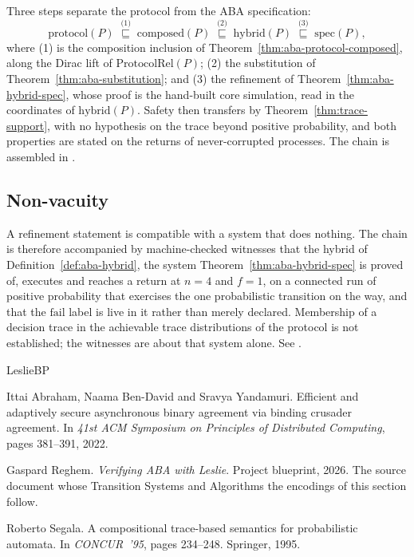 Three steps separate the protocol from the ABA specification:
\[
  \mathrm{protocol}(P)
  \;\overset{\text{(1)}}{\sqsubseteq}\; \mathrm{composed}(P)
  \;\overset{\text{(2)}}{\sqsubseteq}\; \mathrm{hybrid}(P)
  \;\overset{\text{(3)}}{\sqsubseteq}\; \mathrm{spec}(P),
\]
where (1) is the composition inclusion of Theorem~\ref{thm:aba-protocol-composed}, along the Dirac lift of $\mathrm{ProtocolRel}(P)$; (2) the substitution of Theorem~\ref{thm:aba-substitution}; and (3) the refinement of Theorem~\ref{thm:aba-hybrid-spec}, whose proof is the hand-built core simulation, read in the coordinates of $\mathrm{hybrid}(P)$.
Safety then transfers by Theorem~\ref{thm:trace-support}, with no hypothesis on the trace beyond positive probability, and both properties are stated on the returns of never-corrupted processes.
The chain is assembled in .




\subsection{Non-vacuity}

A refinement statement is compatible with a system that does nothing.
The chain is therefore accompanied by machine-checked witnesses that the hybrid of Definition~\ref{def:aba-hybrid}, the system Theorem~\ref{thm:aba-hybrid-spec} is proved of, executes and reaches a return at $n = 4$ and $f = 1$, on a connected run of positive probability that exercises the one probabilistic transition on the way, and that the $\mathrm{fail}$ label is live in it rather than merely declared.
Membership of a decision trace in the achievable trace distributions of the protocol is not established; the witnesses are about that system alone.
See .



\begin{thebibliography}{LeslieBP}

Ittai Abraham, Naama Ben-David and Sravya Yandamuri.
Efficient and adaptively secure asynchronous binary agreement via binding crusader agreement.
In \emph{41st ACM Symposium on Principles of Distributed Computing}, pages 381--391, 2022.

Gaspard Reghem.
\emph{Verifying ABA with Leslie}.
Project blueprint, 2026.
The source document whose Transition Systems and Algorithms the encodings of this section follow.

Roberto Segala.
A compositional trace-based semantics for probabilistic automata.
In \emph{CONCUR~'95}, pages 234--248. Springer, 1995.

\end{thebibliography}
